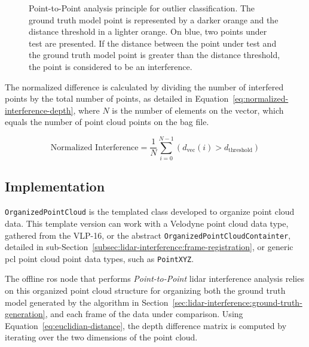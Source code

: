 \begin{figure}[!ht]
	\centering
	\def\svgwidth{0.8\textwidth}
	\fontsize{14}{18}\selectfont
	\graphicspath{{img/lidar-interference/point-to-point-analysis/}}
	
	\caption[Point-to-Point analysis principle for outlier classification]{Point-to-Point analysis principle for outlier classification. The ground truth model point is represented by a darker orange and the distance threshold in a lighter orange. On blue, two points under test are presented. If the distance between the point under test and the ground truth model point is greater than the distance threshold, the point is considered to be an interference.}
	\label{fig:point-to-point-principle}
\end{figure}

The normalized difference is calculated by dividing the number of interfered points by the total number of points, as detailed in Equation~\eqref{eq:normalized-interference-depth}, where $N$ is the number of elements on the vector, which equals the number of point cloud points on the bag file.

\begin{equation}
\label{eq:normalized-interference-depth}
\displaystyle
\text{Normalized Interference} = \frac{1}{N} \sum\limits^{N-1}_{i = 0} \left(d_{\text{vec}}(i)
> d_\text{threshold}\right)
\end{equation}

\subsection{Implementation}
\texttt{OrganizedPointCloud} is the templated class developed to organize point cloud data. This template version can work with a Velodyne point cloud data type, gathered from the VLP-16, or the abstract \texttt{OrganizedPointCloudContainter}, detailed in sub-Section~\ref{subsec:lidar-interference:frame-registration}, or generic \ac{pcl} point cloud point data types, such as \texttt{PointXYZ}.

The offline \ac{ros} node that performs \textit{Point-to-Point} \ac{lidar} interference analysis relies on this organized point cloud structure for organizing both the ground truth model generated by the algorithm in Section~\ref{sec:lidar-interference:ground-truth-generation}, and each frame of the data under comparison. Using Equation~\eqref{eq:euclidian-distance}, the depth difference matrix is computed by iterating over the two dimensions of the point cloud. 

